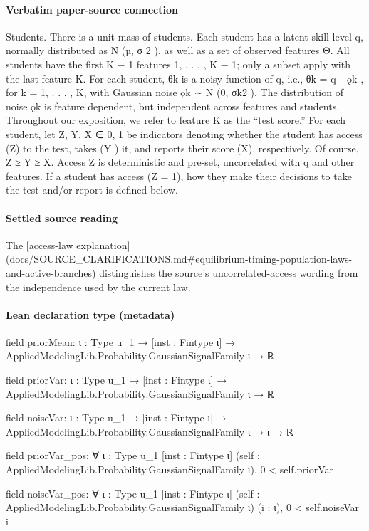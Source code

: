 \documentclass[10pt]{article}
\begin{document}
\paragraph{Verbatim paper-source connection}
\begin{ReviewVerbatim}
Students. There is a unit mass of students. Each student has a latent skill level q, normally
distributed as N (µ, σ 2 ), as well as a set of observed features Θ. All students have the ﬁrst K − 1
features {1, . . . , K − 1}; only a subset apply with the last feature K. For each student, θk is a noisy
function of q, i.e., θk = q +ǫk , for k = 1, . . . , K, with Gaussian noise ǫk ∼ N (0, σk2 ). The distribution
of noise ǫk is feature dependent, but independent across features and students. Throughout our
exposition, we refer to feature K as the “test score.”
For each student, let Z, Y, X ∈ {0, 1} be indicators denoting whether the student has access (Z)
to the test, takes (Y ) it, and reports their score (X), respectively. Of course, Z ≥ Y ≥ X. Access Z
is deterministic and pre-set, uncorrelated with q and other features. If a student has access (Z = 1),
how they make their decisions to take the test and/or report is deﬁned below.
\end{ReviewVerbatim}

\paragraph{Settled source reading}
\begin{sloppypar}
The [access-\allowbreak{}law explanation](docs/\allowbreak{}SOURCE\_\allowbreak{}CLARIFICATIONS.\allowbreak{}md\#equilibrium-\allowbreak{}timing-\allowbreak{}population-\allowbreak{}laws-\allowbreak{}and-\allowbreak{}active-\allowbreak{}branches) distinguishes the source's uncorrelated-\allowbreak{}access wording from the independence used by the current law.\allowbreak{}
\end{sloppypar}

\paragraph{Lean declaration type (metadata)}
\begin{ReviewVerbatim}
field priorMean:
{ι : Type u_1} → [inst : Fintype ι] → AppliedModelingLib.Probability.GaussianSignalFamily ι → ℝ

field priorVar:
{ι : Type u_1} → [inst : Fintype ι] → AppliedModelingLib.Probability.GaussianSignalFamily ι → ℝ

field noiseVar:
{ι : Type u_1} → [inst : Fintype ι] → AppliedModelingLib.Probability.GaussianSignalFamily ι → ι → ℝ

field priorVar_pos:
∀ {ι : Type u_1} [inst : Fintype ι] (self : AppliedModelingLib.Probability.GaussianSignalFamily ι), 0 < self.priorVar

field noiseVar_pos:
∀ {ι : Type u_1} [inst : Fintype ι] (self : AppliedModelingLib.Probability.GaussianSignalFamily ι) (i : ι),
  0 < self.noiseVar i
\end{ReviewVerbatim}
\end{document}
